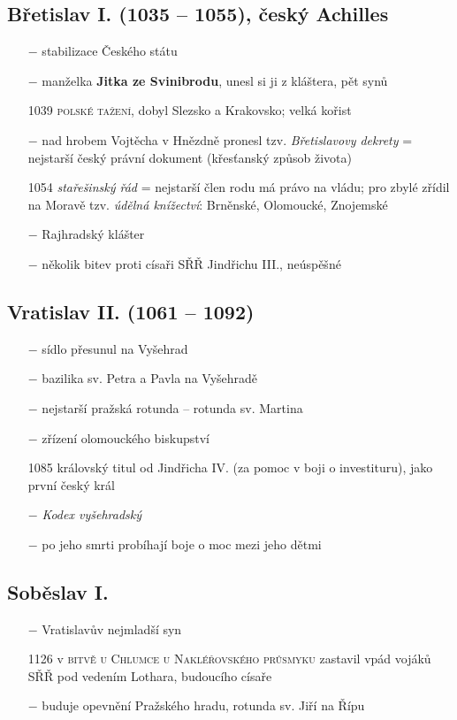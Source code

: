 \documentclass{article}
\begin{document}
\subsection*{Břetislav I. (1035 -- 1055), český Achilles}
\begin{itemize}
    \vspace{-0.5em}
    \setlength\itemsep{0.15em}
    \item[$-$] stabilizace Českého státu
    \item[$-$] manželka \textbf{Jitka ze Svinibrodu}, unesl si ji z kláštera, pět synů
    \item[1039] \textsc{polské tažení}, dobyl Slezsko a Krakovsko; velká kořist
    \item[$-$] nad hrobem Vojtěcha v Hnězdně pronesl tzv. \textit{Břetislavovy dekrety} = nejstarší český právní dokument (křesťanský způsob života)
    \item[1054] \textit{stařešinský řád} = nejstarší člen rodu má právo na vládu; pro zbylé zřídil na Moravě tzv. \textit{údělná knížectví}: Brněnské, Olomoucké, Znojemské
    \item[$-$] Rajhradský klášter
    \item[$-$] několik bitev proti císaři SŘŘ Jindřichu III., neúspěšné
\end{itemize}

\subsection*{Vratislav II. (1061 -- 1092)}
\begin{itemize}
    \vspace{-0.5em}
    \setlength\itemsep{0.15em}
    \item[$-$] sídlo přesunul na Vyšehrad
    \item[$-$] bazilika sv. Petra a Pavla na Vyšehradě
    \item[$-$] nejstarší pražská rotunda -- rotunda sv. Martina
    \item[$-$] zřízení olomouckého biskupství
    \item[1085] královský titul od Jindřicha IV. (za pomoc v boji o investituru), jako první český král
    \item[$-$] \textit{Kodex vyšehradský}
    \item[$-$] po jeho smrti probíhají boje o moc mezi jeho dětmi
\end{itemize}

\subsection*{Soběslav I.}
\begin{itemize}
    \vspace{-0.5em}
    \setlength\itemsep{0.15em}
    \item[$-$] Vratislavův nejmladší syn
    \item[1126] v \textsc{bitvě u Chlumce u Nakléřovského průsmyku} zastavil vpád vojáků SŘŘ pod vedením Lothara, budoucího císaře
    \item[$-$] buduje opevnění Pražského hradu, rotunda sv. Jiří na Řípu
\end{itemize}
\end{document}
